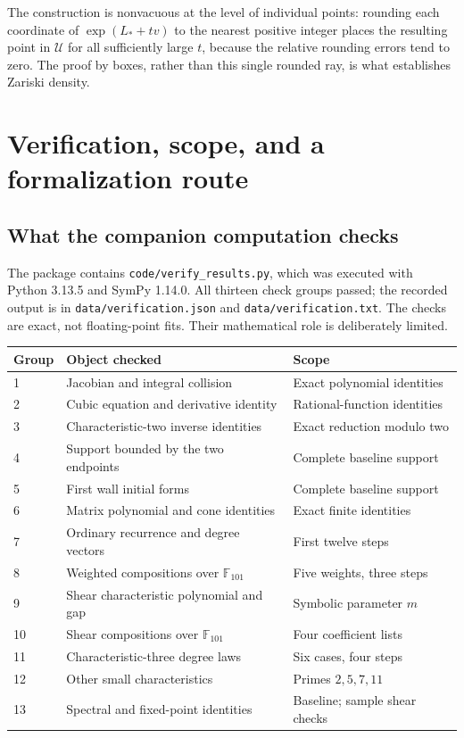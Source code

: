\documentclass[11pt,a4paper]{article}
\numberwithin{equation}{section}
\theoremstyle{definition}
\theoremstyle{remark}
\newcommand{\calU}{\mathcal U}
\begin{document}
The construction is nonvacuous at the level of individual points:
rounding each coordinate of
$\exp(L_*+tv)$ to the nearest positive integer places the resulting
point in $\calU$ for all sufficiently large $t$, because the
relative rounding errors tend to zero. The proof by boxes, rather
than this single rounded ray, is what establishes Zariski density.

\section{Verification, scope, and a formalization route}\label{kmd:sec:verification}

\subsection{What the companion computation checks}
The package contains \texttt{code/verify\_results.py}, which was executed
with Python 3.13.5 and SymPy 1.14.0. All thirteen check groups passed;
the recorded output is in \texttt{data/verification.json} and
\texttt{data/verification.txt}. The checks are exact, not floating-point
fits. Their mathematical role is deliberately limited.

\begin{center}
\small
\begin{tabular}{@{}p{}p{}p{}@{}}
\toprule
Group & Object checked & Scope\\
\midrule
1 & Jacobian and integral collision & Exact polynomial identities\\
2 & Cubic equation and derivative identity & Rational-function identities\\
3 & Characteristic-two inverse identities & Exact reduction modulo two\\
4 & Support bounded by the two endpoints & Complete baseline support\\
5 & First wall initial forms & Complete baseline support\\
6 & Matrix polynomial and cone identities & Exact finite identities\\
7 & Ordinary recurrence and degree vectors & First twelve steps\\
8 & Weighted compositions over $\mathbb F_{101}$ & Five weights, three steps\\
9 & Shear characteristic polynomial and gap & Symbolic parameter $m$\\
10 & Shear compositions over $\mathbb F_{101}$ & Four coefficient lists\\
11 & Characteristic-three degree laws & Six cases, four steps\\
12 & Other small characteristics & Primes $2,5,7,11$\\
13 & Spectral and fixed-point identities & Baseline; sample shear checks\\
\bottomrule
\end{tabular}
\end{center}
\end{document}
